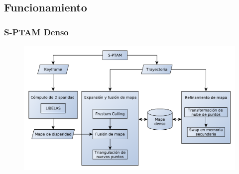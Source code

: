 \documentclass[compress]{beamer}
\begin{document}
\subsection{Funcionamiento}


\begin{frame}
	\frametitle{S-PTAM Denso}
	
	\begin{figure}[htb]
		\centering
		\includegraphics[width=1.0\columnwidth]{method/metodo-diagram.pdf}
		\hfill
	\end{figure}
\end{frame}
\end{document}
